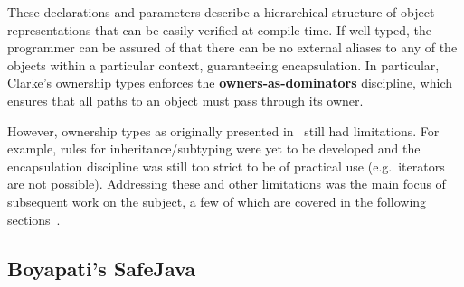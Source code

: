 \documentclass{acm_proc_article-sp}
\begin{document}
These declarations and parameters describe a hierarchical structure of object
representations that can be easily verified at compile-time. If well-typed, the
programmer can be assured of that there can be no external aliases to any of
the objects within a particular context, guaranteeing encapsulation. In
particular, Clarke's ownership types enforces the \textbf{owners-as-dominators}
discipline, which ensures that all paths to an object must pass through its
owner.

However, ownership types as originally presented in~\cite{clarke98ownership}
still had limitations. For example, rules for inheritance/subtyping were yet to
be developed and the encapsulation discipline was still too strict to be of
practical use (e.g.\ iterators are not possible). Addressing these and other
limitations was the main focus of subsequent work on the subject, a few of
which are covered in the following sections~\cite{boyapati04safejava,
boyapati03innerclass, cunningham08ut, dietl11gut, cameron07mojo}.

%
%
%
%
%
%


\subsection{Boyapati's SafeJava}
\label{subsec:boyapati}
\end{document}
